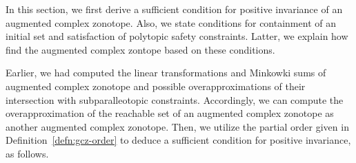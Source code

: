

In this section, we first derive a sufficient condition for positive
invariance of an augmented complex zonotope.  Also, we state
conditions for containment of an initial set and satisfaction of
polytopic safety constraints.  Latter, we explain how find the
augmented complex zontope based on these conditions.

Earlier, we had computed the linear transformations and Minkowki sums
of augmented complex zonotope and possible overapproximations of their
intersection with subparalleotopic constraints.  Accordingly, we can
compute the overapproximation of the reachable set of an augmented
complex zonotope as another augmented complex zonotope.  Then, we
utilize the partial order given in Definition~\ref{defn:gcz-order} to
  deduce a sufficient condition for positive invariance, as follows.
%
